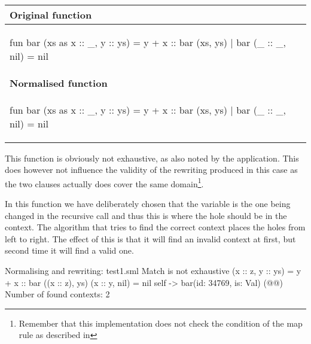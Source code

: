 \begin{example}\
  \label{ex:eval-map-rewrite-bar}\\

  \begin{center}
    \begin{tabular}{|l|l|}
      \hline
      \textbf{Original function}
      \\\hline
      \begin{sml}
fun bar (xs as x :: _, y :: ys) = y + x :: bar (xs, ys)
  | bar (_ :: _, nil) = nil
      \end{sml}
      \\\hline
      \textbf{Normalised function}
      \\\hline
      \begin{sml}
fun bar (xs as x :: _, y :: ys) = y + x :: bar (xs, ys)
  | bar (_ :: _, nil) = nil        
      \end{sml}
      \\\hline
    \end{tabular}
  \end{center}

  \noindent
  This function is obviously not exhaustive, as also noted by the
  \ttt{RewriteMap} application. This does however not influence the validity of
  the rewriting produced in this case as the two clauses actually does cover the
  same domain\footnote{Remember that this implementation does not check the
    \ttt{where} condition of the map rule as described in
    }.

  In this function we have deliberately chosen that the  variable is the
  one being changed in the recursive call and thus this is where the hole should
  be in the context. The algorithm that tries to find the correct context places
  the holes from left to right. The effect of this is that it will find an
  invalid context at first, but second time it will find a valid one.

  \begin{narrow}{-3em}{0em}
    \setlength{\linewidth}{1.2\linewidth}
    \footnotesize
    
    \begin{multicols}{2}           
      \begin{sml}
Normalising and rewriting: test1.sml
Match is not exhaustive
  (x :: z, y :: ys) = y + x :: bar ((x :: z), ys)
  (x :: y, nil) = nil
self -> bar(id: 34769, is: Val)
(@@)
Number of found contexts: 2


\end{sml}
\end{multicols}
\end{narrow}
\end{example}

